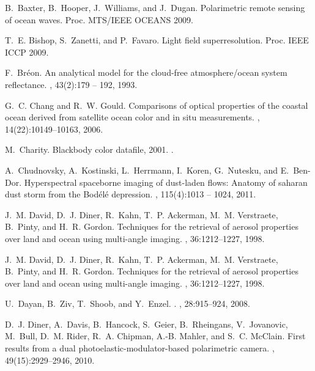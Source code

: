 \documentclass[10pt,twocolumn,letterpaper]{article}
\begin{document}
{\small
%
%

\begin{thebibliography}{10}\itemsep=-1pt

B.~Baxter, B.~Hooper, J.~Williams, and J.~Dugan.
\newblock Polarimetric remote sensing of ocean waves.
\newblock Proc. MTS/IEEE OCEANS 2009.

T.~E. Bishop, S.~Zanetti, and P.~Favaro.
\newblock Light field superresolution.
Proc. IEEE ICCP 2009.

F.~Br\'{e}on.
\newblock An analytical model for the cloud-free atmosphere/ocean system
  reflectance.
, 43(2):179 -- 192, 1993.

G.~C. Chang and R.~W. Gould.
\newblock Comparisons of optical properties of the coastal ocean derived from
  satellite ocean color and in situ measurements.
, 14(22):10149--10163, 2006.

M.~Charity.
\newblock Blackbody color datafile, 2001.
.

A.~Chudnovsky, A.~Kostinski, L.~Herrmann, I.~Koren, G.~Nutesku, and E.~Ben-Dor.
\newblock Hyperspectral spaceborne imaging of dust-laden flows: Anatomy of
  saharan dust storm from the Bod\'{e}l\'{e} depression.
, 115(4):1013 -- 1024, 2011.

J.~M. David, D.~J. Diner, R.~Kahn, T.~P. Ackerman, M.~M. Verstraete, B.~Pinty,
  and H.~R. Gordon.
\newblock Techniques for the retrieval of aerosol properties over land and
  ocean using multi-angle imaging.
,
  36:1212--1227, 1998.

J.~M. David, D.~J. Diner, R.~Kahn, T.~P. Ackerman, M.~M. Verstraete, B.~Pinty,
  and H.~R. Gordon.
\newblock Techniques for the retrieval of aerosol properties over land and
  ocean using multi-angle imaging.
,
  36:1212--1227, 1998.

U.~{Dayan}, B.~{Ziv}, T.~{Shoob}, and Y.~{Enzel}.
.
, 28:915--924, 2008.

D.~J. Diner, A.~Davis, B.~Hancock, S.~Geier, B.~Rheingans, V.~Jovanovic,
  M.~Bull, D.~M. Rider, R.~A. Chipman, A.-B. Mahler, and S.~C. McClain.
\newblock First results from a dual photoelastic-modulator-based polarimetric
  camera.
, 49(15):2929--2946, 2010.


\end{thebibliography}}
\end{document}
